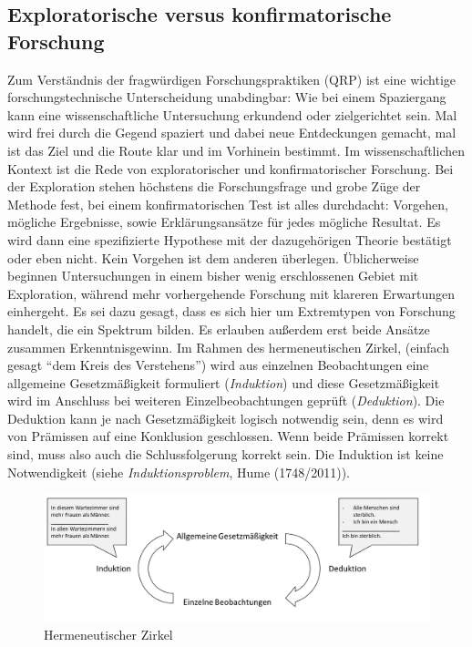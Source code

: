 \documentclass[
  letterpaper,
  DIV=11,
  numbers=noendperiod]{scrreprt}
\begin{document}
\subsection{Exploratorische versus konfirmatorische
Forschung}\label{exploratorische-versus-konfirmatorische-forschung}

Zum Verständnis der fragwürdigen Forschungspraktiken (QRP) ist eine
wichtige forschungstechnische Unterscheidung unabdingbar: Wie bei einem
Spaziergang kann eine wissenschaftliche Untersuchung erkundend oder
zielgerichtet sein. Mal wird frei durch die Gegend spaziert und dabei
neue Entdeckungen gemacht, mal ist das Ziel und die Route klar und im
Vorhinein bestimmt. Im wissenschaftlichen Kontext ist die Rede von
exploratorischer und konfirmatorischer Forschung. Bei der Exploration
stehen höchstens die Forschungsfrage und grobe Züge der Methode fest,
bei einem konfirmatorischen Test ist alles durchdacht: Vorgehen,
mögliche Ergebnisse, sowie Erklärungsansätze für jedes mögliche
Resultat. Es wird dann eine spezifizierte Hypothese mit der
dazugehörigen Theorie bestätigt oder eben nicht. Kein Vorgehen ist dem
anderen überlegen. Üblicherweise beginnen Untersuchungen in einem bisher
wenig erschlossenen Gebiet mit Exploration, während mehr vorhergehende
Forschung mit klareren Erwartungen einhergeht. Es sei dazu gesagt, dass
es sich hier um Extremtypen von Forschung handelt, die ein Spektrum
bilden. Es erlauben außerdem erst beide Ansätze zusammen
Erkenntnisgewinn. Im Rahmen des hermeneutischen Zirkel, (einfach gesagt
``dem Kreis des Verstehens'') wird aus einzelnen Beobachtungen eine
allgemeine Gesetzmäßigkeit formuliert (\emph{Induktion}) und diese
Gesetzmäßigkeit wird im Anschluss bei weiteren Einzelbeobachtungen
geprüft (\emph{Deduktion}). Die Deduktion kann je nach Gesetzmäßigkeit
logisch notwendig sein, denn es wird von Prämissen auf eine Konklusion
geschlossen. Wenn beide Prämissen korrekt sind, muss also auch die
Schlussfolgerung korrekt sein. Die Induktion ist keine Notwendigkeit
(siehe \emph{Induktionsproblem}, Hume (1748/2011)).

\begin{figure}[H]

{\centering \includegraphics{images/hermeneutischerzirkel.jpg}

}

\caption{Hermeneutischer Zirkel}

\end{figure}%
\end{document}
